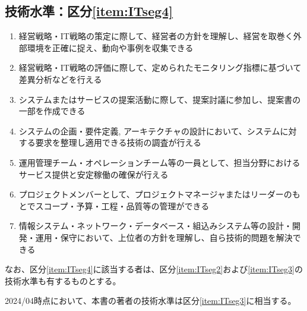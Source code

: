 \clearpage
\subsection{技術水準：区分\ref{item:ITseg4}}
\begin{enumerate}[label=\sarrow]
\item {}経営戦略・IT戦略の策定に際して、経営者の方針を理解し、経営を取巻く外部環境を正確に捉え、動向や事例を収集できる
\item 経営戦略・IT戦略の評価に際して、定められたモニタリング指標に基づいて差異分析などを行える
\item システムまたはサービスの提案活動に際して、提案討議に参加し、提案書の一部を作成できる
\item システムの企画・要件定義, アーキテクチャの設計において、システムに対する要求を整理し適用できる技術の調査が行える
\item 運用管理チーム・オペレーションチーム等の一員として、担当分野におけるサービス提供と安定稼働の確保が行える
\item プロジェクトメンバーとして、プロジェクトマネージャまたはリーダーのもとでスコープ・予算・工程・品質等の管理ができる
\item {}情報システム・ネットワーク・データベース・組込みシステム等の設計・開発・運用・保守において、上位者の方針を理解し、自ら技術的問題を解決できる
\end{enumerate}
なお、区分\ref{item:ITseg4}\hx に該当する者は、区分\ref{item:ITseg2}\hx および\ref{item:ITseg3}\hx の技術水準も有するものとする。
\begin{marker}
2024/04時点において、本書の著者の技術水準は区分\ref{item:ITseg3}\hx に相当する。
\end{marker}
